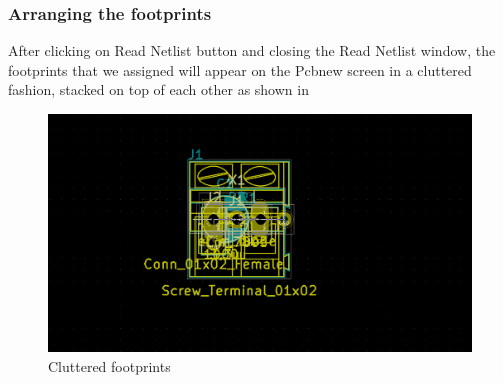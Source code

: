 \subsubsection{Arranging the footprints}
\begin{compactenum}
\item After clicking on Read Netlist button and closing the Read Netlist window, the footprints that we assigned will appear on the Pcbnew screen in a cluttered fashion, stacked on top of each other as shown in 
\begin{figure}
\centering
\includegraphics[height=0.4\textwidth]{cluterredFPs.png}
\caption{Cluttered footprints}
\label{cluttered}
\end{figure}


\end{compactenum}
